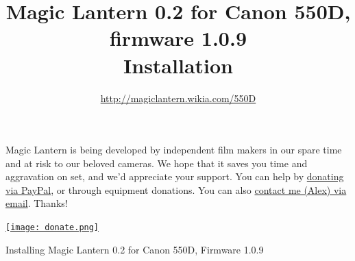 \documentclass[a4paper,english]{article}
\begin{document}
\title{Magic Lantern 0.2 for Canon 550D, firmware 1.0.9\\Installation}
\author{\url{http://magiclantern.wikia.com/550D}}
\maketitle

\vspace{5mm}
\begin{center}

\begin{minipage}{13cm}

\end{minipage}
\vspace{5mm}

\begin{minipage}{13cm}
Magic Lantern is being developed by independent film makers in our spare time and at risk to our beloved cameras. We hope that it saves you time and aggravation on set, and we'd appreciate your support. You can help by \href{https://www.paypal.com/cgi-bin/webscr?cmd=_donations&business=ELJ6U9GGFPL3U&lc=RO&item_name=Magic%20Lantern%20firmware%20for%20Canon%20550D&currency_code=EUR&bn=PP%2dDonationsBF%3abtn_donate_LG%2egif%3aNonHostedGuest}{donating via PayPal}, or through equipment donations. You can also \href{mailto:broscutamaker@gmail.com}{contact me (Alex) via email}. Thanks!

\vspace{2mm}
\hskip1mm \href{https://www.paypal.com/cgi-bin/webscr?cmd=_donations&business=ELJ6U9GGFPL3U&lc=RO&item_name=Magic%20Lantern%20firmware%20for%20Canon%20550D&currency_code=EUR&bn=PP%2dDonationsBF%3abtn_donate_LG%2egif%3aNonHostedGuest}{\texttt{[image: donate.png]}}
\end{minipage}
\end{center}


\newpage
\begin{center}
\begin{minipage}{13cm}
\tableofcontents
\end{minipage}
\end{center}
\newpage



Installing Magic Lantern 0.2 for Canon 550D, Firmware 1.0.9


\end{document}
